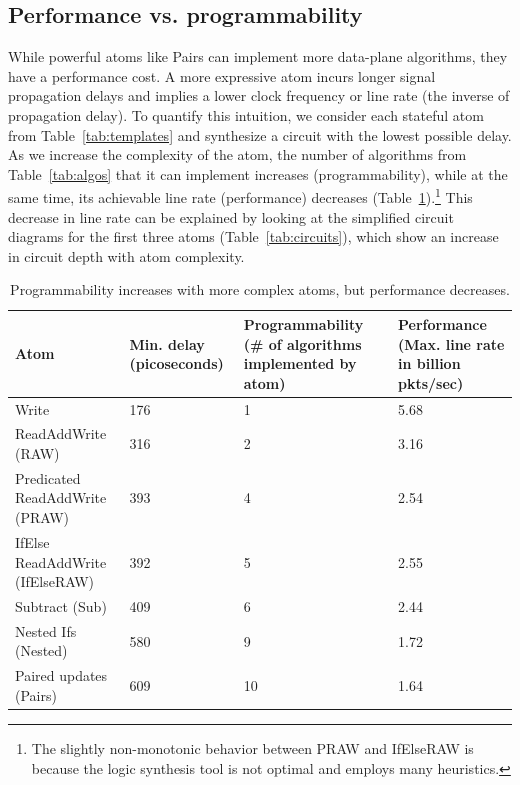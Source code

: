 \subsection{Performance vs. programmability}
\label{ss:perfprog}
While powerful atoms like Pairs can implement more data-plane algorithms, they
have a performance cost.  A more expressive atom incurs longer signal
propagation delays and implies a lower clock frequency or line rate
(the inverse of propagation delay).  To quantify
this intuition, we consider each stateful atom from Table~\ref{tab:templates}
and synthesize a circuit with the lowest possible delay. As we increase the
complexity of the atom, the number of algorithms from Table~\ref{tab:algos}
that it can implement increases (programmability), while at the same time, its
achievable line rate (performance) decreases
(Table~\ref{tab:perfprog}).\footnote{The slightly non-monotonic behavior
between PRAW and IfElseRAW is because the logic synthesis tool is not optimal
and employs many heuristics.} This decrease in line rate can be explained by
looking at the simplified circuit diagrams for the first three atoms
(Table~\ref{tab:circuits}), which show an increase in circuit depth with atom
complexity.

\begin{table}[!t]
  \begin{scriptsize}
  \begin{tabular}{|p{}|p{}|p{}|p{}|}
  \hline
  Atom & Min. delay (picoseconds) & Programmability (\# of algorithms implemented by atom) & Performance (Max. line rate in billion pkts/sec) \\
  \hline
  Write & 176 & 1  & 5.68 \\
  \hline
  ReadAddWrite (RAW) & 316 & 2 & 3.16\\
  \hline
  Predicated ReadAddWrite (PRAW) & 393 & 4 & 2.54 \\
  \hline
  IfElse ReadAddWrite (IfElseRAW) & 392 & 5 & 2.55 \\
  \hline
  Subtract (Sub) & 409 & 6 & 2.44 \\
  \hline
  Nested Ifs (Nested) & 580 & 9 & 1.72 \\
  \hline
  Paired updates (Pairs) & 609 & 10 & 1.64 \\
  \hline
  \end{tabular}
\end{scriptsize}
\caption{Programmability increases with more complex atoms,
  but performance decreases.}
\label{tab:perfprog}
\end{table}

